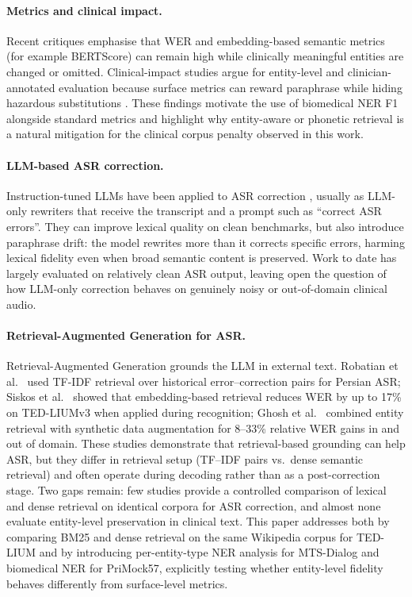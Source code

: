\documentclass[11pt,a4paper,twocolumn]{article}
\begin{document}
\paragraph{Metrics and clinical impact.}
Recent critiques emphasise that WER and embedding-based semantic metrics (for
example BERTScore) can remain high while clinically meaningful entities are
changed or omitted. Clinical-impact studies argue for entity-level and
clinician-annotated evaluation because surface metrics can reward paraphrase
while hiding hazardous substitutions \cite{ellis2025clinicalasr}. These
findings motivate the use of biomedical NER F1 alongside standard metrics and
highlight why entity-aware or phonetic retrieval is a natural mitigation for
the clinical corpus penalty observed in this work.

\paragraph{LLM-based ASR correction.}
Instruction-tuned LLMs have been applied to ASR correction \cite{si2024}, usually
as LLM-only rewriters that receive the transcript and a prompt such as
``correct ASR errors''. They can improve lexical quality on clean benchmarks,
but also introduce paraphrase drift: the model rewrites more than it corrects
specific errors, harming lexical fidelity even when broad semantic content is
preserved. Work to date has largely evaluated on relatively clean ASR output,
leaving open the question of how LLM-only correction behaves on genuinely noisy
or out-of-domain clinical audio.

\paragraph{Retrieval-Augmented Generation for ASR.}
Retrieval-Augmented Generation grounds the LLM in external text. Robatian et
al.\ \cite{robatian2025} used TF-IDF retrieval over historical
error--correction pairs for Persian ASR; Siskos et al.\ \cite{siskos2025} showed
that embedding-based retrieval reduces WER by up to 17\% on TED-LIUMv3 when
applied during recognition; Ghosh et al.\ \cite{ghosh2024} combined entity
retrieval with synthetic data augmentation for 8--33\% relative WER gains in
and out of domain. These studies demonstrate that retrieval-based grounding
can help ASR, but they differ in retrieval setup (TF--IDF pairs vs.\ dense
semantic retrieval) and often operate during decoding rather than as a
post-correction stage. Two gaps remain: few studies provide a controlled
comparison of lexical and dense retrieval on identical corpora for ASR
correction, and almost none evaluate entity-level preservation in clinical text.
This paper addresses both by comparing BM25 and dense retrieval on the
same Wikipedia corpus for TED-LIUM and by introducing per-entity-type NER
analysis for MTS-Dialog and biomedical NER for PriMock57, explicitly testing
whether entity-level fidelity behaves differently from surface-level metrics.
\end{document}
